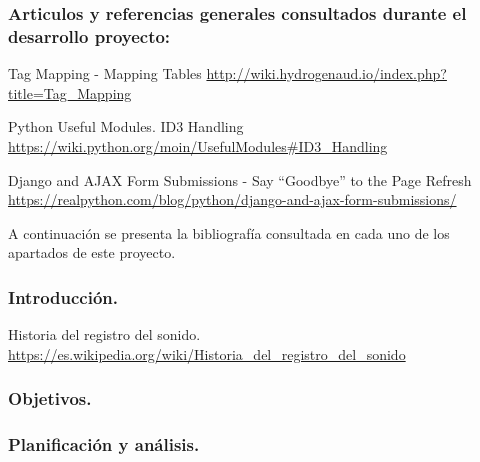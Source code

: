 \label{cap:bibliografia}

\subsubsection*{Articulos y referencias generales consultados durante el desarrollo proyecto:}

 Tag Mapping - Mapping Tables \url{http://wiki.hydrogenaud.io/index.php?title=Tag_Mapping}

 Python Useful Modules. ID3 Handling \url{https://wiki.python.org/moin/UsefulModules#ID3_Handling}

 Django and AJAX Form Submissions - Say ``Goodbye'' to the Page Refresh \url{https://realpython.com/blog/python/django-and-ajax-form-submissions/}


A continuación se presenta la bibliografía consultada en cada uno de los apartados de este proyecto.

\bigskip

\subsubsection*{Introducción.}

 Historia del registro del sonido. \url{https://es.wikipedia.org/wiki/Historia_del_registro_del_sonido}

\subsubsection*{Objetivos.}

\subsubsection*{Planificación y análisis.}

